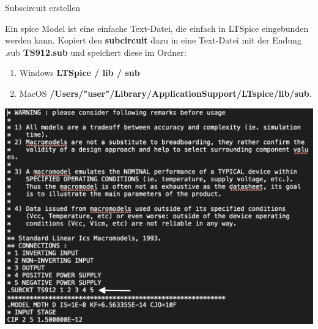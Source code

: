 \begin{frame}[t]{Subscircuit erstellen} 

    Ein spice Model ist eine einfache Text-Datei, die einfach in LTSpice eingebunden werden kann.
    Kopiert den \textbf{subcircuit} dazu in eine Text-Datei mit der Endung .sub \textbf{TS912.sub} und speichert diese im Ordner:

    \begin{scriptsize}
        \begin{enumerate}
            \item Windows \textbf{LTSpice / lib / sub} 
            \item MacOS \textbf{/Users/"user"/Library/ApplicationSupport/LTspice/lib/sub}.
        \end{enumerate}
    \end{scriptsize}

    \begin{spacing}{0.9} \begin{tiny}
        \begin{minipage}{\textwidth}
          \includegraphics[width=0.5\linewidth]{pictures/spice_model.png}
        \end{minipage}
    \end{tiny} \end{spacing}
\end{frame}

